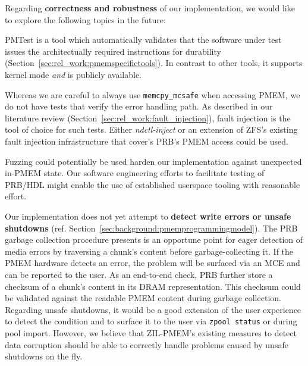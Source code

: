 \documentclass[12pt,a4paper,twoside]{book}
\begin{document}
Regarding \textbf{correctness and robustness} of our implementation, we would like to explore the following topics in the future:
\begin{description}[noitemsep,leftmargin=1.5cm,labelindent=1cm]
    \item[Validating PMEM Durability] PMTest is a tool which automatically validates that the software under test issues the architectually required instructions for durability (Section~\ref{sec:rel_work:pmemspecifictools}).
        In contrast to other tools, it supports kernel mode \textit{and} is publicly available.

    \item[Fault Injection for PMEM Access] Whereas we are careful to always use \lstinline{memcpy_mcsafe} when accessing PMEM, we do not have tests that verify the error handling path.
        As described in our literature review (Section~\ref{sec:rel_work:fault_injection}), fault injection is the tool of choice for such tests.
        Either \textit{ndctl-inject} or an extension of ZFS's existing fault injection infrastructure that cover's PRB's PMEM access could be used.

    \item[Fuzzing] Fuzzing could potentially be used harden our implementation against unexpected in-PMEM state.
        Our software engineering efforts to facilitate testing of PRB/HDL might enable the use of established userspace tooling with reasonable effort.
\end{description}

Our implementation does not yet attempt to \textbf{detect write errors or unsafe shutdowns} (ref. Section~\ref{sec:background:pmemprogrammingmodel}).
The PRB garbage collection procedure presents is an opportune point for eager detection of media errors by traversing a chunk's content before garbage-collecting it.
If the PMEM hardware detects an error, the problem will be surfaced via an MCE and can be reported to the user.
As an end-to-end check, PRB further store a checksum of a chunk's content in its DRAM representation. This checksum could be validated against the readable PMEM content during garbage collection.
Regarding unsafe shutdowns, it would be a good extension of the user experience to detect the condition and to surface it to the user via \lstinline{zpool status} or during pool import.
However, we believe that ZIL-PMEM's existing measures to detect data corruption should be able to correctly handle problems caused by unsafe shutdowns on the fly.
\end{document}

